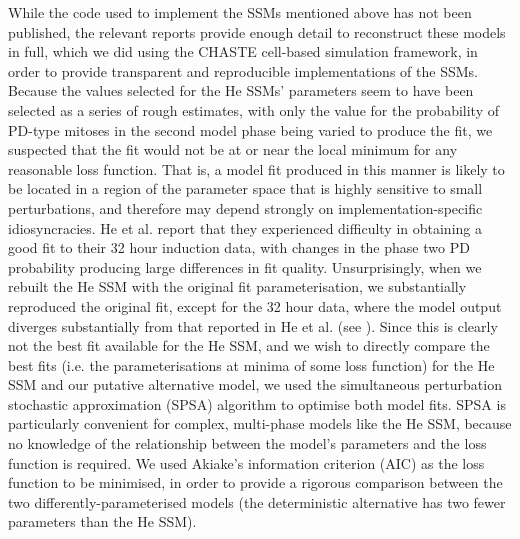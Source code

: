 While the code used to implement the SSMs mentioned above has not been published, the relevant reports provide enough detail to reconstruct these models in full, which we did using the CHASTE cell-based simulation framework, in order to provide transparent and reproducible implementations of the SSMs. Because the values selected for the He SSMs' parameters seem to have been selected as a series of rough estimates, with only the value for the probability of PD-type mitoses in the second model phase being varied to produce the fit, we suspected that the fit would not be at or near the local minimum for any reasonable loss function. That is, a model fit produced in this manner is likely to be located in a region of the parameter space that is highly sensitive to small perturbations, and therefore may depend strongly on implementation-specific idiosyncracies. He et al. report that they experienced difficulty in obtaining a good fit to their 32 hour induction data, with changes in the phase two PD probability producing large differences in fit quality. Unsurprisingly, when we rebuilt the He SSM with the original fit parameterisation, we substantially reproduced the original fit, except for the 32 hour data, where the model output diverges substantially from that reported in He et al. (see ). Since this is clearly not the best fit available for the He SSM, and we wish to directly compare the best fits (i.e. the parameterisations at minima of some loss function) for the He SSM and our putative alternative model, we used the simultaneous perturbation stochastic approximation (SPSA) algorithm\cite{Spall1998} to optimise both model fits. SPSA is particularly convenient for complex, multi-phase models like the He SSM, because no knowledge of the relationship between the model's parameters and the loss function is required. We used Akiake's information criterion (AIC) as the loss function to be minimised, in order to provide a rigorous comparison between the two differently-parameterised models (the deterministic alternative has two fewer parameters than the He SSM). 

